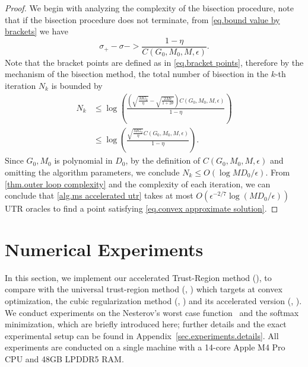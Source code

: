 \documentclass{article}
\begin{document}
\begin{proof}
    We begin with analyzing the complexity of the bisection procedure, note that if the bisection procedure does not terminate, from \eqref{eq.bound value by brackets} we have
    \begin{equation*}
        \sigma_+-\sigma- > \frac{1-\eta}{ C(G_0,M_0,M,\epsilon)}.
    \end{equation*}
    Note that the bracket points are defined as in \eqref{eq.bracket points}, therefore by the mechanism of the bisection method, the total number of bisection in the $k$-th iteration $N_k$ is bounded by 
    \begin{equation*}
    \begin{aligned}
        N_k &\leq \log \left(\frac{\left(\sqrt{\frac{MG_0}{\eta}}-\sqrt{\frac{2M\epsilon}{1+2\theta}}\right)C(G_0,M_0,M,\epsilon)}{1-\eta}\right)\\
        &\leq \log \left(\frac{\sqrt{\frac{MG_0}{\eta}}C(G_0,M_0,M,\epsilon)}{1-\eta}\right).
    \end{aligned}
    \end{equation*}
    Since $G_0,M_0$ is polynomial in $D_0$, by the definition of $C(G_0,M_0,M,\epsilon)$ and omitting the algorithm parameters, we conclude $N_k \leq O\left(\log MD_0/\epsilon\right)$. From \autoref{thm.outer loop complexity} and the complexity of each iteration, we can conclude that \autoref{alg.ms accelerated utr} takes at most $O\left(\epsilon^{-2/7}\log \left(MD_0/\epsilon\right)\right)$ UTR oracles to find a point satisfying \eqref{eq.convex approximate solution}.
\end{proof}

\section{Numerical Experiments}\label{sec.experiments}
In this section, we implement our accelerated Trust-Region method (\atr{}), to compare with the universal trust-region method (\utr{}, \citet{jiang2024nonconvexityuniversaltrustregionmethod}) which targets at convex optimization, the cubic regularization method (\arc{}, \citet{nesterov2006cubic}) and its accelerated version (\arca{}, \citet{nesterov2008accelerating}). We conduct experiments on the Nesterov's worst case function~\cite{nesterovImplementableTensorMethods2021} and the softmax minimization, which are briefly introduced here; further details and the exact experimental setup can be found in Appendix~\ref{sec.experiments.details}. All experiments are conducted on a single machine with a 14-core Apple M4 Pro CPU  and 48GB LPDDR5 RAM.
\end{document}
